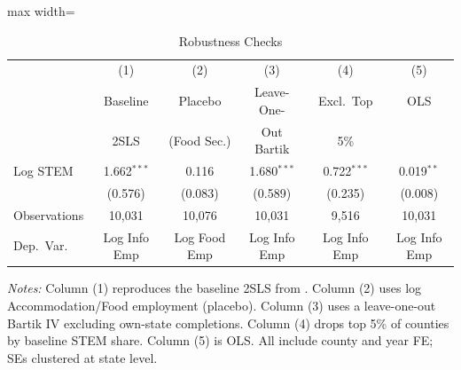 \begin{table}[H]
\centering
\caption{Robustness Checks}
\label{tab:robust}
\begin{adjustbox}{max width=\textwidth}
\begin{threeparttable}
\begin{tabular}{lccccc}
\toprule
 & (1) & (2) & (3) & (4) & (5) \\
 & Baseline & Placebo & Leave-One- & Excl.\ Top & OLS \\
 & 2SLS & (Food Sec.) & Out Bartik & 5\% & \\
\midrule
Log STEM & 1.662$^{***}$ & 0.116 & 1.680$^{***}$ & 0.722$^{***}$ & 0.019$^{**}$ \\
 & (0.576) & (0.083) & (0.589) & (0.235) & (0.008) \\
\addlinespace
Observations & 10,031 & 10,076 & 10,031 & 9,516 & 10,031 \\
Dep.\ Var. & Log Info Emp & Log Food Emp & Log Info Emp & Log Info Emp & Log Info Emp \\
\bottomrule
\end{tabular}
\begin{tablenotes}[flushleft]
\footnotesize
\item \textit{Notes:} Column (1) reproduces the baseline 2SLS from . Column (2) uses log Accommodation/Food employment (placebo). Column (3) uses a leave-one-out Bartik IV excluding own-state completions. Column (4) drops top 5\% of counties by baseline STEM share. Column (5) is OLS. All include county and year FE; SEs clustered at state level.
\end{tablenotes}
\end{threeparttable}
\end{adjustbox}
\end{table}

